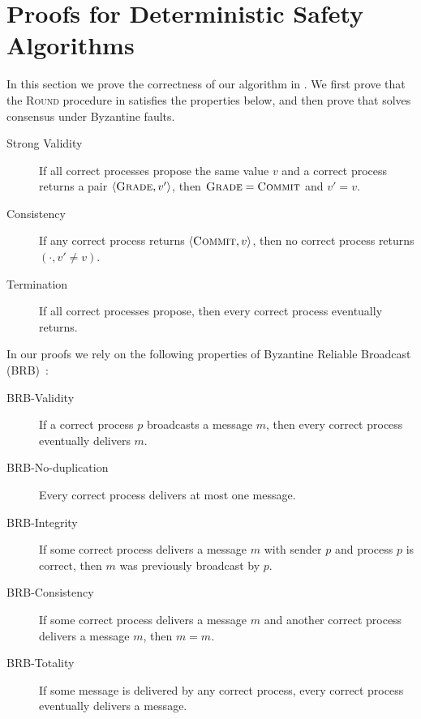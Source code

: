 \section{Proofs for Deterministic Safety Algorithms}\label{sec:proofs-det}

In this section we prove the correctness of our algorithm in .
We first prove that the \textsc{Round} procedure in  satisfies the properties below, and then prove that  solves consensus under Byzantine faults.
\begin{description}
    \item[Strong Validity] If all correct processes propose the same value $v$ and a correct process returns a pair $\langle \textsc{Grade}, v' \rangle$, then $\textsc{Grade} = \textsc{Commit}$ and $v' = v$.
    \item[Consistency] If any correct process returns  $\langle \textsc{Commit}, v \rangle$, then no correct process returns $(\cdot, v' \ne v)$.
    \item[Termination] If all correct processes propose, then every correct process eventually returns.
\end{description}

In our proofs we rely on the following properties of Byzantine Reliable Broadcast (BRB)~\cite{book}:
\begin{description}
    \item[BRB-Validity] If a correct process $p$ broadcasts a message $m$, then every correct process eventually delivers $m$.
    \item[BRB-No-duplication] Every correct process delivers at most one message.
    \item[BRB-Integrity] If some correct process delivers a message $m$ with sender $p$ and process $p$ is correct, then $m$ was previously broadcast by $p$.
    \item[BRB-Consistency] If some correct process delivers a message $m$ and another correct process delivers a message $m$, then $m = m$.
    \item[BRB-Totality] If some message is delivered by any correct process, every correct process eventually delivers a message.
\end{description}

